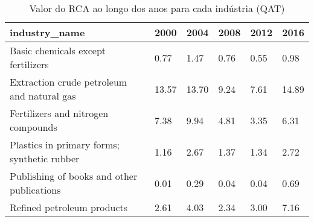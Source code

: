 \begin{table}
\centering
\caption{Valor do RCA ao longo dos anos para cada indústria (QAT)}
\begin{tabular}{p{6cm}p{1.5cm}p{1.5cm}p{1.5cm}p{1.5cm}p{1.5cm}}
\toprule
                              industry\_name &  2000 &  2004 & 2008 & 2012 &  2016 \\
\midrule
         Basic chemicals except fertilizers &  0.77 &  1.47 & 0.76 & 0.55 &  0.98 \\
 Extraction crude petroleum and natural gas & 13.57 & 13.70 & 9.24 & 7.61 & 14.89 \\
         Fertilizers and nitrogen compounds &  7.38 &  9.94 & 4.81 & 3.35 &  6.31 \\
Plastics in primary forms; synthetic rubber &  1.16 &  2.67 & 1.37 & 1.34 &  2.72 \\
 Publishing of books and other publications &  0.01 &  0.29 & 0.04 & 0.04 &  0.69 \\
                 Refined petroleum products &  2.61 &  4.03 & 2.34 & 3.00 &  7.16 \\
\bottomrule
\end{tabular}
\end{table}
